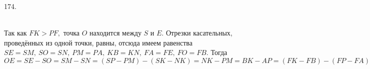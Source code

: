 174. \begin{figure}[ht!]
\end{figure}\\
Так как $FK>PF,$ точка $O$ находится между $S$ и $E.$ Отрезки касательных, проведённых из одной точки, равны, отсюда имеем равенства $SE = SM,\ SO = SN,\ PM =
PA,\ KB = KN,\  FA = FE,\  FO = FB.$ Тогда $OE = SE - SO = SM - SN = (SP - PM) - (SK - NK) = NK - PM =
BK - AP = (FK - FB) - (FP - FA) = FA - FB + 2 = FE - FO + 2 =
2 - OE \Rightarrow 2OE = 2\Rightarrow OE=1.$\\
